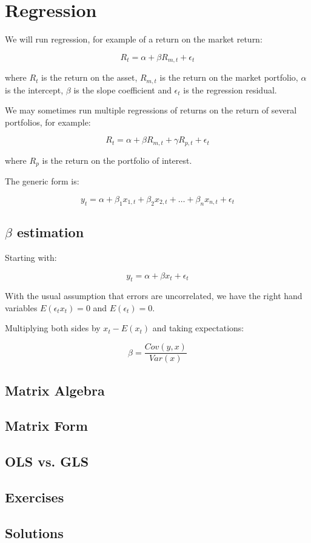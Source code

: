 \chapter{Regression}


We will run regression, for example of a return 
on the market return:

\begin{equation}
    \label{eq:regression}
    R_t = \alpha + \beta R_{m,t} + \epsilon_t
\end{equation}

where $R_t$ is the return on the asset, $R_{m,t}$ is the return on the market
portfolio, $\alpha$ is the intercept, $\beta$ is the slope coefficient and
$\epsilon_t$ is the regression residual.

We may sometimes run multiple regressions of returns on the return
of several portfolios, for example:

\begin{equation}
    \label{eq:multiregression}
    R_t = \alpha + \beta R_{m,t} + \gamma R_{p,t} + \epsilon_t
\end{equation}

where $R_p$ is the return on the portfolio of interest.

The generic form is:

\begin{equation}
    \label{eq:genericregression}
    y_t = \alpha + \beta_1 x_{1,t} + \beta_2 x_{2,t} + \ldots + \beta_n x_{n,t} + \epsilon_t
\end{equation}

\section{$\beta$ estimation}

Starting with:

\begin{equation}
y_t = \alpha + \beta x_t + \epsilon_t
\end{equation}

With the usual assumption that errors are uncorrelated, we have 
the right hand variables $E(\epsilon_t x_t) = 0$ and $E(\epsilon_t) = 0$.

Multiplying both sides by $x_t - E(x_t)$ and taking expectations:


\begin{equation}
    \label{eq:population}
    \beta = \frac{Cov(y,x)}{Var(x)}
\end{equation}

\section{Matrix Algebra}

\section{Matrix Form}

\section{OLS vs. GLS}

\section{Exercises}

\section{Solutions}